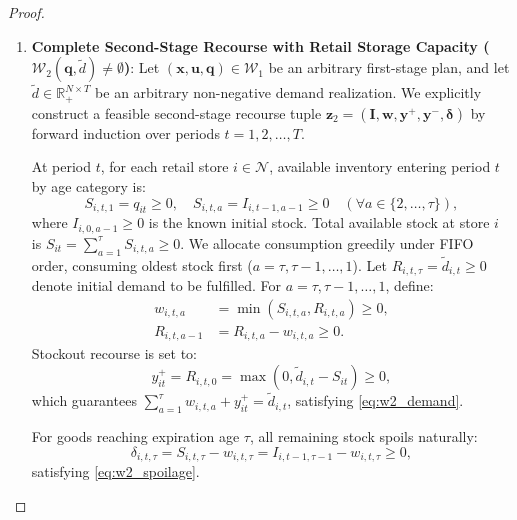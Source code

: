 \documentclass[11pt,a4paper]{article}
\theoremstyle{definition}
\theoremstyle{remark}
\begin{document}
\begin{proof}
\begin{enumerate}[label=\textbf{Part \arabic*.},wide=0pt]
    \item \textbf{Complete Second-Stage Recourse with Retail Storage Capacity ($\mathcal{W}_2(\mathbf{q}, \tilde{d}) \neq \emptyset$)}:
    Let $(\mathbf{x}, \mathbf{u}, \mathbf{q}) \in \mathcal{W}_1$ be an arbitrary first-stage plan, and let $\tilde{d} \in \mathbb{R}_+^{N \times T}$ be an arbitrary non-negative demand realization. We explicitly construct a feasible second-stage recourse tuple $\mathbf{z}_2 = (\mathbf{I}, \mathbf{w}, \mathbf{y}^+, \mathbf{y}^-, \boldsymbol{\delta})$ by forward induction over periods $t = 1, 2, \dots, T$.
    
    At period $t$, for each retail store $i \in \mathcal{N}$, available inventory entering period $t$ by age category is:
    \begin{equation*}
        S_{i,t,1} = q_{it} \ge 0, \quad S_{i,t,a} = I_{i,t-1,a-1} \ge 0 \quad (\forall a \in \{2, \dots, \tau\}),
    \end{equation*}
    where $I_{i,0,a-1} \ge 0$ is the known initial stock. Total available stock at store $i$ is $S_{it} = \sum_{a=1}^\tau S_{i,t,a} \ge 0$.
    We allocate consumption greedily under FIFO order, consuming oldest stock first ($a = \tau, \tau-1, \dots, 1$). Let $R_{i,t,\tau} = \tilde{d}_{i,t} \ge 0$ denote initial demand to be fulfilled. For $a = \tau, \tau-1, \dots, 1$, define:
    \begin{align*}
        w_{i,t,a} &= \min\left( S_{i,t,a}, R_{i,t,a} \right) \ge 0, \\
        R_{i,t,a-1} &= R_{i,t,a} - w_{i,t,a} \ge 0.
    \end{align*}
    Stockout recourse is set to:
    \begin{equation*}
        y_{it}^+ = R_{i,t,0} = \max\left(0, \tilde{d}_{i,t} - S_{it}\right) \ge 0,
    \end{equation*}
    which guarantees $\sum_{a=1}^\tau w_{i,t,a} + y_{it}^+ = \tilde{d}_{i,t}$, satisfying \eqref{eq:w2_demand}.
    
    For goods reaching expiration age $\tau$, all remaining stock spoils naturally:
    \begin{equation*}
        \delta_{i,t,\tau} = S_{i,t,\tau} - w_{i,t,\tau} = I_{i,t-1,\tau-1} - w_{i,t,\tau} \ge 0,
    \end{equation*}
    satisfying \eqref{eq:w2_spoilage}.
    

\end{enumerate}
\end{proof}
\end{document}
